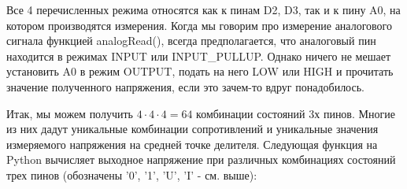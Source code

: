 Все 4 перечисленных режима относятся как к пинам D2, D3, так и к пину A0, на котором производятся измерения.  Когда мы говорим про измерение аналогового сигнала функцией analogRead(), всегда предполагается, что аналоговый пин находится в режимах INPUT или INPUT\_PULLUP.  Однако ничего не мешает установить A0 в режим OUTPUT, подать на него LOW или HIGH и прочитать значение полученного напряжения, если это зачем-то вдруг понадобилось.

Итак, мы можем получить $4 \cdot 4 \cdot 4 = 64$ комбинации состояний 3х пинов. Многие из них дадут уникальные комбинации сопротивлений и уникальные значения измеряемого напряжения на средней точке делителя.  Следующая функция на Python вычисляет выходное напряжение при  различных комбинациях состояний трех пинов (обозначены '0', '1', 'U', 'I' - см. выше):

